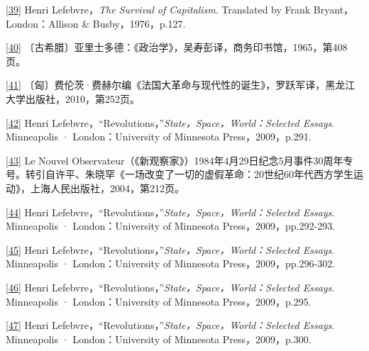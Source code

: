 \documentclass[UTF8, fontset = sourcesans, a4paper, oneside, zihao =
-4, scheme=chinese, no-math, space=true]{ctexbook}
\begin{document}
\protect\hypertarget{part0008_split_003.htmlux5cux23m39}{}{}\protect\hyperlink{part0008_split_002.htmlux5cux23w39}{{[}39{]}}
Henri Lefebvre，\emph{The Survival of Capitalism}. Translated by Frank
Bryant，London：Allison \& Busby，1976，p.127.

\protect\hypertarget{part0008_split_003.htmlux5cux23m40}{}{}\protect\hyperlink{part0008_split_003.htmlux5cux23w40}{{[}40{]}}
〔古希腊〕亚里士多德：《政治学》，吴寿彭译，商务印书馆，1965，第408页。

\protect\hypertarget{part0008_split_003.htmlux5cux23m41}{}{}\protect\hyperlink{part0008_split_003.htmlux5cux23w41}{{[}41{]}}
〔匈〕费伦茨·费赫尔编《法国大革命与现代性的诞生》，罗跃军译，黑龙江大学出版社，2010，第252页。

\protect\hypertarget{part0008_split_003.htmlux5cux23m42}{}{}\protect\hyperlink{part0008_split_003.htmlux5cux23w42}{{[}42{]}}
Henri Lefebvre，``Revolutions，''\emph{State，Space，World：Selected
Essays}. Minneapolis · London：University of Minnesota
Press，2009，p.291.

\protect\hypertarget{part0008_split_003.htmlux5cux23m43}{}{}\protect\hyperlink{part0008_split_003.htmlux5cux23w43}{{[}43{]}}
Le Nouvel
Observateur（《新观察家》）1984年4月29日纪念5月事件30周年专号。转引自许平、朱晓罕《一场改变了一切的虚假革命：20世纪60年代西方学生运动》，上海人民出版社，2004，第212页。

\protect\hypertarget{part0008_split_003.htmlux5cux23m44}{}{}\protect\hyperlink{part0008_split_003.htmlux5cux23w44}{{[}44{]}}
Henri Lefebvre，``Revolutions，''\emph{State，Space，World：Selected
Essays}. Minneapolis · London：University of Minnesota
Press，2009，pp.292-293.

\protect\hypertarget{part0008_split_003.htmlux5cux23m45}{}{}\protect\hyperlink{part0008_split_003.htmlux5cux23w45}{{[}45{]}}
Henri Lefebvre，``Revolutions，''\emph{State，Space，World：Selected
Essays}. Minneapolis · London：University of Minnesota
Press，2009，pp.296-302.

\protect\hypertarget{part0008_split_003.htmlux5cux23m46}{}{}\protect\hyperlink{part0008_split_003.htmlux5cux23w46}{{[}46{]}}
Henri Lefebvre，``Revolutions，''\emph{State，Space，World：Selected
Essays}. Minneapolis · London：University of Minnesota
Press，2009，p.295.

\protect\hypertarget{part0008_split_003.htmlux5cux23m47}{}{}\protect\hyperlink{part0008_split_003.htmlux5cux23w47}{{[}47{]}}
Henri Lefebvre，``Revolutions，''\emph{State，Space，World：Selected
Essays}. Minneapolis · London：University of Minnesota
Press，2009，p.300.
\end{document}
